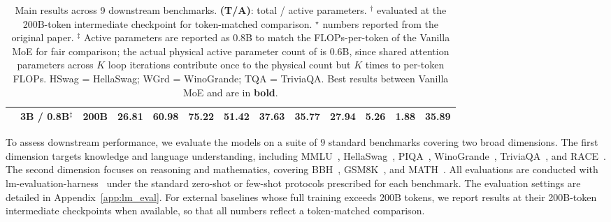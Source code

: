 \begin{table}[htbp]
{\begin{tabular}{l c c cc ccc cc cc c}
\textbf{\ourmodelnospace}         & 3B / 0.8B$^{\ddagger}$    & 200B   & 26.81 & \textbf{60.98} & \textbf{75.22} & \textbf{51.42} & \textbf{37.63} & \textbf{35.77} & \textbf{27.94} & \textbf{5.26} & \textbf{1.88} & \textbf{35.89} \\
\bottomrule
\end{tabular}}
\caption{
Main results across 9 downstream benchmarks. 
\textbf{(T/A)}: total / active parameters. 
$^{\dagger}$ evaluated at the 200B-token intermediate checkpoint for token-matched comparison.
$^{\star}$ numbers reported from the original paper.
$^{\ddagger}$ Active parameters are reported as 0.8B to match the FLOPs-per-token of the Vanilla MoE for fair comparison; the actual physical active parameter count of \ourmodel is 0.6B, since shared attention parameters across $K$ loop iterations contribute once to the physical count but $K$ times to per-token FLOPs.
HSwag = HellaSwag; WGrd = WinoGrande; TQA = TriviaQA.
Best results between Vanilla MoE and \ourmodel are in \textbf{bold}.
}
\label{tab:main_results}
\end{table}

To assess downstream performance, we evaluate the models on a suite of $9$ standard benchmarks covering two broad dimensions. The first dimension targets knowledge and language understanding, including MMLU~\cite{hendryckstest2021}, HellaSwag~\cite{zellers2019hellaswag}, PIQA~\cite{bisk2020piqa}, WinoGrande~\cite{sakaguchi2021winogrande}, TriviaQA~\cite{joshi2017triviaqa}, and RACE~\cite{lai2017race}. The second dimension focuses on reasoning and mathematics, covering BBH~\cite{kazemi2025big}, GSM8K~\cite{cobbe2021training}, and MATH~\cite{hendrycksmath2021}. All evaluations are conducted with lm-evaluation-harness~\cite{eval-harness} under the standard zero-shot or few-shot protocols prescribed for each benchmark. The evaluation settings are detailed in Appendix~\ref{app:lm_eval}. For external baselines whose full training exceeds 200B tokens, we report results at their 200B-token intermediate checkpoints when available, so that all numbers reflect a token-matched comparison.
